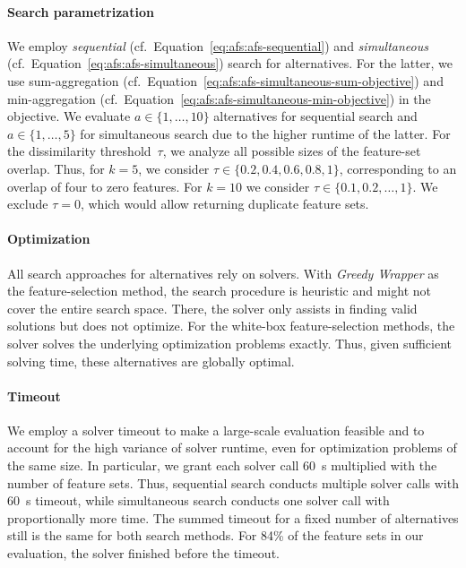 \documentclass{article}
\theoremstyle{definition}
\begin{document}
\paragraph{Search parametrization}

We employ \emph{sequential} (cf.~Equation~\ref{eq:afs:afs-sequential}) and \emph{simultaneous} (cf.~Equation~\ref{eq:afs:afs-simultaneous}) search for alternatives.
For the latter, we use sum-aggregation (cf.~Equation~\ref{eq:afs:afs-simultaneous-sum-objective}) and min-aggregation (cf.~Equation~\ref{eq:afs:afs-simultaneous-min-objective}) in the objective.
We evaluate $a \in \{1, \dots, 10\}$ alternatives for sequential search and $a \in \{1, \dots, 5\}$ for simultaneous search due to the higher runtime of the latter.
For the dissimilarity threshold~$\tau$, we analyze all possible sizes of the feature-set overlap.
Thus, for $k=5$, we consider $\tau \in \{0.2, 0.4, 0.6, 0.8, 1\}$, corresponding to an overlap of four to zero features.
For $k=10$ we consider $\tau \in \{0.1, 0.2, \dots, 1\}$.
We exclude $\tau = 0$, which would allow returning duplicate feature sets.

\paragraph{Optimization}

All search approaches for alternatives rely on solvers.
With \emph{Greedy Wrapper} as the feature-selection method, the search procedure is heuristic and might not cover the entire search space.
There, the solver only assists in finding valid solutions but does not optimize.
For the white-box feature-selection methods, the solver solves the underlying optimization problems exactly.
Thus, given sufficient solving time, these alternatives are globally optimal.

\paragraph{Timeout}

We employ a solver timeout to make a large-scale evaluation feasible and to account for the high variance of solver runtime, even for optimization problems of the same size.
In particular, we grant each solver call 60~s multiplied with the number of feature sets.
Thus, sequential search conducts multiple solver calls with 60~s timeout, while simultaneous search conducts one solver call with proportionally more time.
The summed timeout for a fixed number of alternatives still is the same for both search methods.
For 84\% of the feature sets in our evaluation, the solver finished before the timeout.
\end{document}
